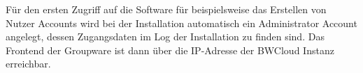 Für den ersten Zugriff auf die Software für beispielsweise das Erstellen von Nutzer Accounts wird bei der Installation automatisch ein Administrator Account angelegt, dessen Zugangsdaten im Log der Installation zu finden sind.
Das Frontend der Groupware ist dann über die IP-Adresse der BWCloud Instanz erreichbar.